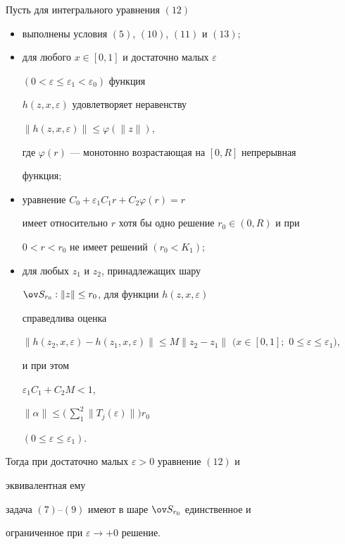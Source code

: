 \begin{thm} 


Пусть для интегрального уравнения $(12)$ 


\begin{itemize} 


\item[1.] выполнены условия $(5)$, $(10)$, $(11)$ и $(13);$ 


\item[2.] для любого $x\in[0,1]$ и достаточно малых $\varepsilon$ 


$(0<\varepsilon\le\varepsilon_1<\varepsilon_0)$ функция 


$h(z,x,\varepsilon)$ удовлетворяет неравенству 


$\|h(z,x,\varepsilon)\|\le\varphi(\|z\|)$, 


где $\varphi(r)$ --- монотонно возрастающая на $[0,R]$ непрерывная 


функция$;$ 


\item[3.] уравнение $C_0+\varepsilon_1C_1 r+C_2\varphi(r)=r$ 


имеет относительно $r$ хотя бы одно решение $r_0\in(0,R)$ и при 


$0<r<r_0$ не имеет решений $(r_0<K_1);$ 


\item[4.] для любых $z_1$ и $z_2$, принадлежащих шару 


$\ov S_{r_0}:\|z\|\le r_0$, для функции $h(z,x,\varepsilon)$ 


справедлива оценка 


$\|h(z_2,x,\varepsilon)-h(z_1,x,\varepsilon)\|\le M 


\|z_2-z_1\|$ $(x\in[0,1];$ $0\le\varepsilon\le\varepsilon_1)$,


и при этом 


$\varepsilon_1C_1+C_2M<1$,


$\|\alpha\|\le\Big(\,\sum\limits^2_1\|T_j(\varepsilon)\|\Big)r_0$


$(0\le\varepsilon\le\varepsilon_1)$. 


\end{itemize} 


Тогда при достаточно малых $\varepsilon>0$ уравнение $(12)$ и 


эквивалентная ему 


задача $(7)$--$(9)$ имеют в шаре $\ov S_{r_0}$ единственное и 


ограниченное при $\varepsilon\to+0$ решение. 


\end{thm} 



